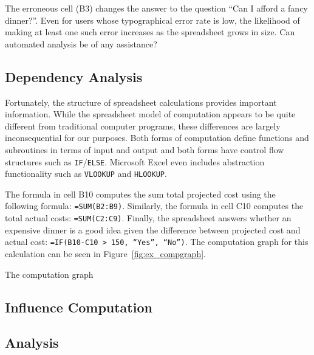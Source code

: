 The erroneous cell (B3) changes the answer to the question ``Can I afford a fancy dinner?''.  Even for users whose typographical error rate is low, the likelihood of making at least one such error increases as the spreadsheet grows in size.  Can automated analysis be of any assistance?

\subsection{Dependency Analysis}



Fortunately, the structure of spreadsheet calculations provides important information.  While the spreadsheet model of computation appears to be quite different from traditional computer programs, these differences are largely inconsequential for our purposes.  Both forms of computation define functions and subroutines in terms of input and output and both forms have control flow structures such as \texttt{IF}/\texttt{ELSE}.  Microsoft Excel even includes abstraction functionality such as \texttt{VLOOKUP} and \texttt{HLOOKUP}.

The formula in cell B10 computes the sum total projected cost using the following formula: \texttt{=SUM(B2:B9)}.  Similarly, the formula in cell C10 computes the total actual costs: \texttt{=SUM(C2:C9)}.  Finally, the spreadsheet answers whether an expensive dinner is a good idea given the difference between projected cost and actual cost: \texttt{=IF(B10-C10 > 150, ``Yes'', ``No'')}.  The computation graph for this calculation can be seen in Figure~\ref{fig:ex_compgraph}.

The computation graph 

\subsection{Influence Computation}

\subsection{Analysis}
